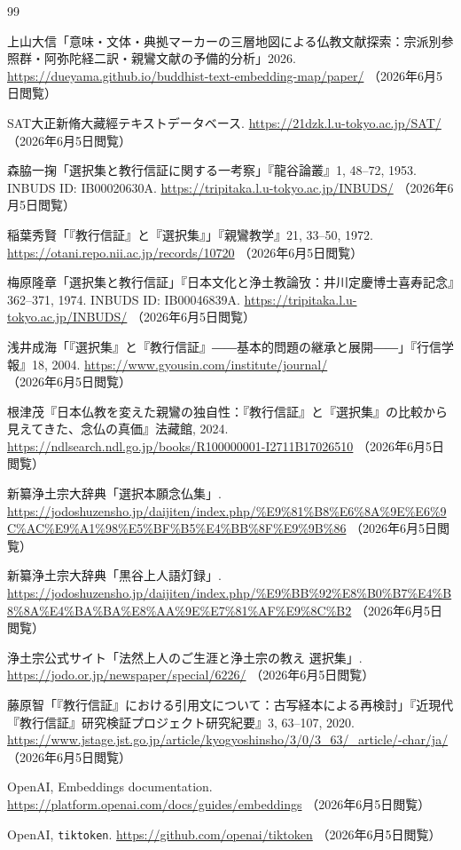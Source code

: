 \documentclass[uplatex,dvipdfmx,11pt,a4paper]{jsarticle}
\begin{document}
\begin{thebibliography}{99}

上山大信「意味・文体・典拠マーカーの三層地図による仏教文献探索：宗派別参照群・阿弥陀経二訳・親鸞文献の予備的分析」2026.
\url{https://dueyama.github.io/buddhist-text-embedding-map/paper/}
（2026年6月5日閲覧）

SAT大正新脩大藏經テキストデータベース.
\url{https://21dzk.l.u-tokyo.ac.jp/SAT/}
（2026年6月5日閲覧）

森脇一掬「選択集と教行信証に関する一考察」『龍谷論叢』1, 48--72, 1953.
INBUDS ID: IB00020630A.
\url{https://tripitaka.l.u-tokyo.ac.jp/INBUDS/}
（2026年6月5日閲覧）

稲葉秀賢「『教行信証』と『選択集』」『親鸞教学』21, 33--50, 1972.
\url{https://otani.repo.nii.ac.jp/records/10720}
（2026年6月5日閲覧）

梅原隆章「選択集と教行信証」『日本文化と浄土教論攷：井川定慶博士喜寿記念』362--371, 1974.
INBUDS ID: IB00046839A.
\url{https://tripitaka.l.u-tokyo.ac.jp/INBUDS/}
（2026年6月5日閲覧）

浅井成海「『選択集』と『教行信証』――基本的問題の継承と展開――」『行信学報』18, 2004.
\url{https://www.gyousin.com/institute/journal/}
（2026年6月5日閲覧）

根津茂『日本仏教を変えた親鸞の独自性：『教行信証』と『選択集』の比較から見えてきた、念仏の真価』法藏館, 2024.
\url{https://ndlsearch.ndl.go.jp/books/R100000001-I2711B17026510}
（2026年6月5日閲覧）

新纂浄土宗大辞典「選択本願念仏集」.
\url{https://jodoshuzensho.jp/daijiten/index.php/%E9%81%B8%E6%8A%9E%E6%9C%AC%E9%A1%98%E5%BF%B5%E4%BB%8F%E9%9B%86}
（2026年6月5日閲覧）

新纂浄土宗大辞典「黒谷上人語灯録」.
\url{https://jodoshuzensho.jp/daijiten/index.php/%E9%BB%92%E8%B0%B7%E4%B8%8A%E4%BA%BA%E8%AA%9E%E7%81%AF%E9%8C%B2}
（2026年6月5日閲覧）

浄土宗公式サイト「法然上人のご生涯と浄土宗の教え 選択集」.
\url{https://jodo.or.jp/newspaper/special/6226/}
（2026年6月5日閲覧）

藤原智「『教行信証』における引用文について：古写経本による再検討」『近現代『教行信証』研究検証プロジェクト研究紀要』3, 63--107, 2020.
\url{https://www.jstage.jst.go.jp/article/kyogyoshinsho/3/0/3_63/_article/-char/ja/}
（2026年6月5日閲覧）

OpenAI, Embeddings documentation.
\url{https://platform.openai.com/docs/guides/embeddings}
（2026年6月5日閲覧）

OpenAI, \texttt{tiktoken}.
\url{https://github.com/openai/tiktoken}
（2026年6月5日閲覧）

\end{thebibliography}
\end{document}

